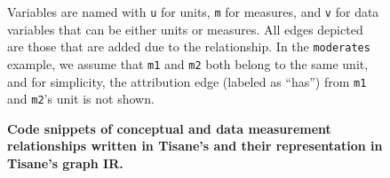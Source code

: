 {\begin{figure}
        \caption{\textbf{Code snippets of conceptual and data measurement relationships written in Tisane's \SDSLlong and their representation in Tisane's graph IR.}}
            \begin{small}
            \begin{minipage}{\linewidth}
                Variables are named with \texttt{u} for units, \texttt{m} for measures, and \texttt{v} for data variables that can be either units or measures. All edges depicted are those that are added due to the relationship. In the \texttt{moderates} example, we assume that \texttt{m1} and \texttt{m2} both belong to the same unit, and for simplicity, the attribution edge (labeled as ``has'') from \texttt{m1} and \texttt{m2}'s unit is not shown.
            \end{minipage}
            \end{small}
        \label{fig:figureSDSLToGraphIR}
    \end{figure}
}

